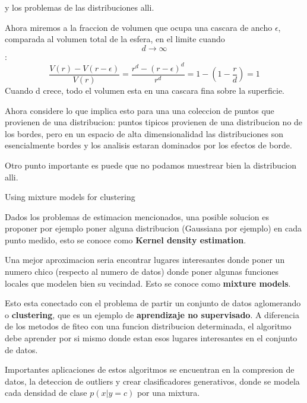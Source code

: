 \documentclass[ignorenonframetext,]{beamer}
\begin{document}
\begin{frame}

\begin{block}{y los problemas de las distribuciones alli.}

Ahora miremos a la fraccion de volumen que ocupa una cascara de ancho
\(\epsilon\), comparada al volumen total de la esfera, en el limite
cuando \[d \rightarrow \infty\]: \[
\frac{V(r)-V(r-\epsilon)}{V(r)}=\frac{r^{d}-(r-\epsilon)^{d}}{r^{d}}=1-(1-\frac{r}{d})=1
\] Cuando d crece, todo el volumen esta en una cascara fina sobre la
superficie.

Ahora considere lo que implica esto para una una coleccion de puntos que
provienen de una distribucion: puntos tipicos provienen de una
distribucion no de los bordes, pero en un espacio de alta
dimensionalidad las distribuciones son esencialmente bordes y los
analisis estaran dominados por los efectos de borde.

Otro punto importante es puede que no podamos muestrear bien la
distribucion alli.

\end{block}

\end{frame}

\begin{frame}

\begin{block}{Using mixture models for clustering}

Dados los problemas de estimacion mencionados, una posible solucion es
proponer por ejemplo poner alguna distribucion (Gaussiana por ejemplo)
en cada punto medido, esto se conoce como \textbf{Kernel density
estimation}.

Una mejor aproximacion seria encontrar lugares interesantes donde poner
un numero chico (respecto al numero de datos) donde poner algunas
funciones locales que modelen bien su vecindad. Esto se conoce como
\textbf{mixture models}.

Esto esta conectado con el problema de partir un conjunto de datos
aglomerando o \textbf{clustering}, que es un ejemplo de
\textbf{aprendizaje no supervisado}. A diferencia de los metodos de
fiteo con una funcion distribucion determinada, el algoritmo debe
aprender por si mismo donde estan esos lugares interesantes en el
conjunto de datos.

Importantes aplicaciones de estos algoritmos se encuentran en la
compresion de datos, la deteccion de outliers y crear clasificadores
generativos, donde se modela cada densidad de clase \(p(x|y = c)\) por
una mixtura.

\end{block}

\end{frame}
\end{document}
